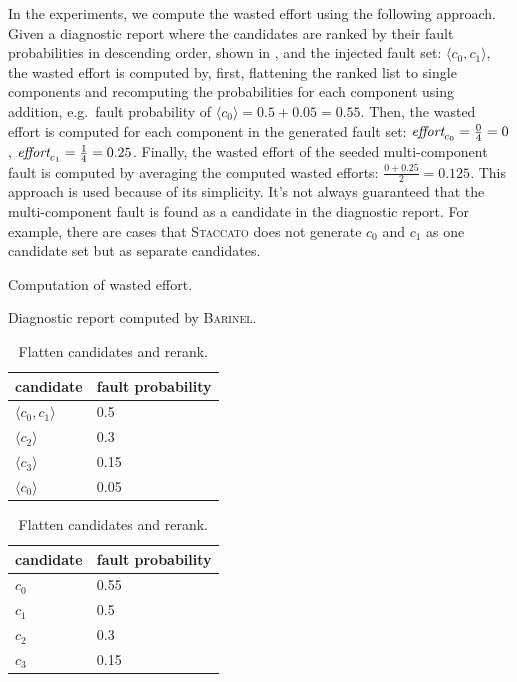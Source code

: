 \documentclass[twoside,a4paper,11pt]{memoir}
\begin{document}
In the experiments, we compute the wasted effort using the following approach.
Given a diagnostic report where the candidates are ranked by their fault probabilities in descending order, shown in , and the injected fault set: \(\langle c_0, c_1 \rangle \), the wasted effort is computed by, first, flattening the ranked list to single components and recomputing the probabilities for each component using addition, e.g.\ fault probability of \(\langle c_0 \rangle = 0.5 + 0.05 = 0.55\).
Then, the wasted effort is computed for each component in the generated fault set: \(\emph{effort}_{c_0} = \frac{0}{4} = 0\), \(\emph{effort}_{c_1} = \frac{1}{4} = 0.25\).
Finally, the wasted effort of the seeded multi-component fault is computed by averaging the computed wasted efforts: \(\frac{0 + 0.25}{2} = 0.125\).
This approach is used because of its simplicity.
It's not always guaranteed that the multi-component fault is found as a candidate in the diagnostic report.
For example, there are cases that \textsc{Staccato} does not generate \(c_0\) and \(c_1\) as one candidate set but as separate candidates.
\begin{table}[]
    \centering
    \scriptsize
    \caption{Computation of wasted effort.}%
    \label{tab:diagnostic_report}
    \begin{subtable}{.5\linewidth}
      \centering
        \caption{Diagnostic report computed by \textsc{Barinel}.}
        \begin{tabular}{l|l}
            candidate & fault probability \\ \hline
            \(\langle c_0, c_1 \rangle \) & 0.5 \\
            \(\langle c_2 \rangle \) & 0.3 \\
            \(\langle c_3 \rangle \) & 0.15 \\
            \(\langle c_0 \rangle \) & 0.05 \\
        \end{tabular}
    \end{subtable}%
    \begin{subtable}{.5\linewidth}
      \centering
        \caption{Flatten candidates and rerank.}
        \begin{tabular}{l|l}
            candidate & fault probability \\ \hline
            \( c_0 \) & 0.55 \\
            \(c_1 \) & 0.5 \\
            \(c_2 \) & 0.3 \\
            \(c_3 \) & 0.15 \\
        \end{tabular}
    \end{subtable}
\end{table}
\end{document}

